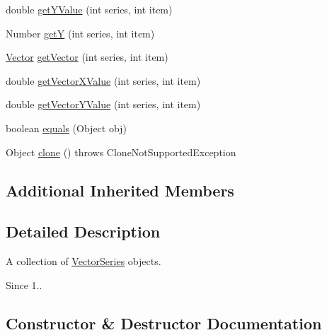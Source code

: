 \begin{DoxyCompactItemize}
\item 
double \mbox{\hyperlink{classorg_1_1jfree_1_1data_1_1xy_1_1_vector_series_collection_a418ee78010207ee552d5c2e74a031b31}{get\+Y\+Value}} (int series, int item)
\item 
Number \mbox{\hyperlink{classorg_1_1jfree_1_1data_1_1xy_1_1_vector_series_collection_a835b5143e64a99dff524840bba65ce5d}{getY}} (int series, int item)
\item 
\mbox{\hyperlink{classorg_1_1jfree_1_1data_1_1xy_1_1_vector}{Vector}} \mbox{\hyperlink{classorg_1_1jfree_1_1data_1_1xy_1_1_vector_series_collection_a6ab6bd07b9a775e401201ac380ee5750}{get\+Vector}} (int series, int item)
\item 
double \mbox{\hyperlink{classorg_1_1jfree_1_1data_1_1xy_1_1_vector_series_collection_acb84437fda51302c4a5b8a300cd812fb}{get\+Vector\+X\+Value}} (int series, int item)
\item 
double \mbox{\hyperlink{classorg_1_1jfree_1_1data_1_1xy_1_1_vector_series_collection_a70d900e7ff5c26b9b94b607b820d6567}{get\+Vector\+Y\+Value}} (int series, int item)
\item 
boolean \mbox{\hyperlink{classorg_1_1jfree_1_1data_1_1xy_1_1_vector_series_collection_a18831d0feec3be9925da5d17c3a9b829}{equals}} (Object obj)
\item 
Object \mbox{\hyperlink{classorg_1_1jfree_1_1data_1_1xy_1_1_vector_series_collection_a293406705f9600ee21a357c1c6242b34}{clone}} ()  throws Clone\+Not\+Supported\+Exception 
\end{DoxyCompactItemize}
\subsection*{Additional Inherited Members}


\subsection{Detailed Description}
A collection of \mbox{\hyperlink{classorg_1_1jfree_1_1data_1_1xy_1_1_vector_series}{Vector\+Series}} objects.

\begin{DoxySince}{Since}
1.. 
\end{DoxySince}


\subsection{Constructor \& Destructor Documentation}
\mbox{\label{classorg_1_1jfree_1_1data_1_1xy_1_1_vector_series_collection_a24e9e816014cc1a6010370efd6fd75f3}} 
